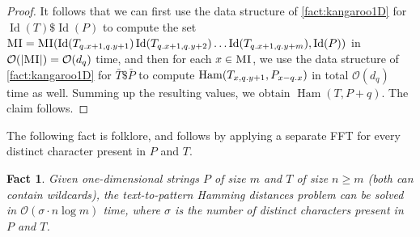 \documentclass[11pt, letterpaper]{article}
\theoremstyle{plain}
\newtheorem{fact}{Fact}
\theoremstyle{definition}
\theoremstyle{remark}
\renewcommand{\O}{\mathcal{O}}
\DeclareMathOperator*{\Ham}{Ham}
\DeclareMathOperator*{\ID}{Id}
\newcommand{\absolute}[1]{\left\lvert#1\right\rvert}
\begin{document}
\begin{proof}
It follows that we can first use the data structure of \cref{fact:kangaroo1D} for  $\ID(T) \$ \ID(P)$ to compute the set $\MI =  \MI(\ID(T_{\x{q}+1, \y{q}+1}) \ID(T_{\x{q}+1, \y{q}+2}) \ldots \ID(T_{\x{q}+1, \y{q}+m}), \ID(P))$ in $\O(\absolute{\MI}) = \O(d_q)$ time, and then for each $x \in \textsc{MI}$, we use the data structure of  \cref{fact:kangaroo1D}  for $\bar{T} \$ \bar{P}$ to compute 
$\Ham(T_{x, \y{q}+1}, P_{x-\x{q}})$ in total $\O(d_q)$ time as well. Summing up the resulting values, we obtain $\Ham(T, P+q)$. The claim follows. 
\end{proof}

The following fact is folklore, and follows by applying a separate FFT for every distinct character present in $P$ and $T$.

\begin{fact}\label{fact:sigman1d}
Given one-dimensional strings $P$ of size $m$ and $T$ of size $n \ge m$ (both can contain wildcards), the text-to-pattern Hamming distances problem can be solved in $\O(\sigma \cdot n \log m)$ time, where $\sigma$ is the number of distinct characters present in $P$ and $T$.
\end{fact}
\end{document}
